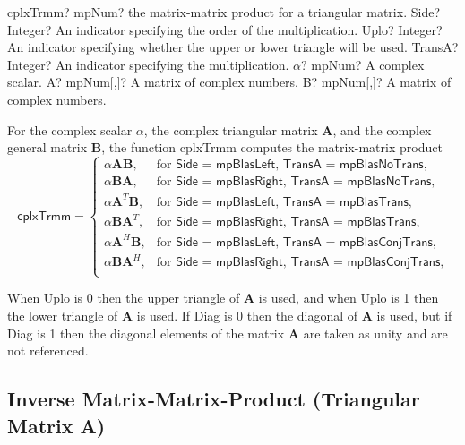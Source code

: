 \vspace{0.6cm}
\begin{mpFunctionsExtract}
	\mpFunctionSix
	{cplxTrmm? mpNum? the matrix-matrix product for a triangular matrix.}
	{Side? Integer? An indicator specifying the order of the multiplication.}
	{Uplo? Integer? An indicator specifying whether the upper or lower triangle will be used.}
	{TransA? Integer? An indicator specifying the multiplication.}
	{$\alpha$? mpNum? A complex scalar.}
	{A? mpNum[,]? A matrix of complex numbers.}
	{B? mpNum[,]? A matrix of complex numbers.}
\end{mpFunctionsExtract}

\vspace{0.3cm}
For the complex scalar $\alpha$, the complex triangular matrix $\boldsymbol{A}$, and  the complex general matrix $\boldsymbol{B}$, the function \textsf{cplxTrmm} computes the matrix-matrix product
\begin{equation}
\textsf{cplxTrmm}=\begin{cases}
\alpha \boldsymbol{A} \boldsymbol{B}, & \text{for } \textsf{Side = mpBlasLeft, TransA = mpBlasNoTrans},\\
\alpha \boldsymbol{B} \boldsymbol{A}, & \text{for } \textsf{Side = mpBlasRight, TransA = mpBlasNoTrans},\\
\alpha \boldsymbol{A}^T \boldsymbol{B}, & \text{for } \textsf{Side = mpBlasLeft, TransA = mpBlasTrans},\\
\alpha \boldsymbol{B} \boldsymbol{A}^T, & \text{for } \textsf{Side = mpBlasRight, TransA = mpBlasTrans},\\
\alpha \boldsymbol{A}^H \boldsymbol{B}, & \text{for } \textsf{Side = mpBlasLeft, TransA = mpBlasConjTrans},\\
\alpha \boldsymbol{B} \boldsymbol{A}^H, & \text{for } \textsf{Side = mpBlasRight, TransA = mpBlasConjTrans},\\
\end{cases}
\end{equation}

When \textsf{Uplo} is 0 then the upper triangle of $\boldsymbol{A}$ is used, and when \textsf{Uplo} is 1 then the lower triangle of $\boldsymbol{A}$ is used. If \textsf{Diag} is 0 then the diagonal of $\boldsymbol{A}$ is used, but if \textsf{Diag} is 1 then the diagonal elements of the matrix $\boldsymbol{A}$ are taken as unity and are not referenced. 






\newpage
\subsection{Inverse Matrix-Matrix-Product (Triangular Matrix A)}

